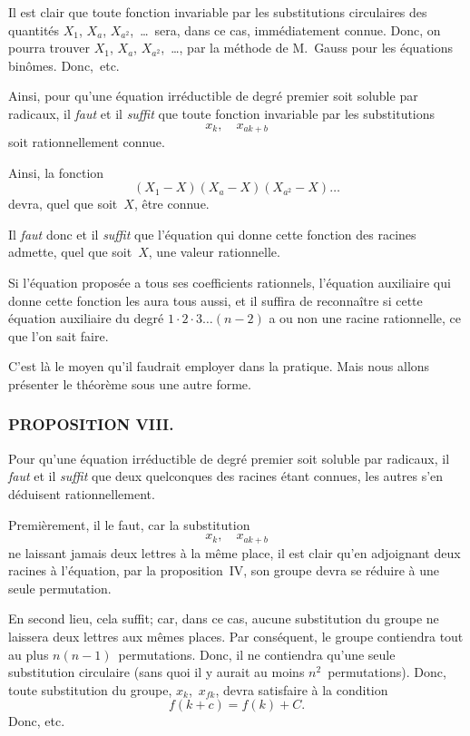 \documentclass[leqno,12pt]{book}[2005/09/16]
\newcommand{\Subsection}[1]{\subsubsection*{\centering\small\normalfont #1}}
\newenvironment{MyEnvt}[2]{%
  \medskip\par
  \ifthenelse{\equal{#1}{}}{%
    \textsc{#2.}\ --- %
  }{%
    \textsc{#2 #1}\ --- %
  }%
  \itshape\ignorespaces
}{\medskip\normalfont}
\newenvironment{Theoreme}[1][]{\begin{MyEnvt}{#1}{Theorème}}{\end{MyEnvt}}
\begin{document}
Il est clair que toute fonction invariable par les substitutions
circulaires des quantités $X_{1}$, $X_{a}$, $X_{a^{2}}$,~\dots\ sera, dans ce cas, immédiatement
connue. Donc, on pourra trouver $X_{1}$, $X_{a}$, $X_{a^{2}}$,~\dots, par
la méthode de M.~Gauss pour les équations binômes. Donc,~etc.

Ainsi, pour qu'une équation irréductible de degré premier soit
soluble par radicaux, il \emph{faut} et il \emph{suffit} que toute fonction invariable
par les substitutions
\[
x_{k}, \quad  x_{ak+b}
\]
soit rationnellement connue.

Ainsi, la fonction
\[
(X_{1} - X) (X_{a} - X) (X_{a^{2}} - X) \dots
\]
devra, quel que soit~$X$, être connue.

Il \emph{faut} donc et il \emph{suffit} que l'équation qui donne cette fonction
des racines admette, quel que soit~$X$, une valeur rationnelle.

Si l'équation proposée a tous ses coefficients rationnels, l'équation
auxiliaire qui donne cette fonction les aura tous aussi, et il
suffira de reconnaître si cette équation auxiliaire du degré
$1 · 2 · 3 \dots (n - 2)$ a ou non une racine rationnelle, ce que l'on
sait faire.

C'est là le moyen qu'il faudrait employer dans la pratique. Mais
nous allons présenter le théorème sous une autre forme.


\Subsection{PROPOSITION VIII.}

\begin{Theoreme}
Pour qu'une équation irréductible de degré
premier soit soluble par radicaux, il \emph{faut} et il \emph{suffit} que deux
quelconques des racines étant connues, les autres s'en déduisent
rationnellement.
\end{Theoreme}

Premièrement, il le faut, car la substitution
\[
x_{k}, \quad x_{ak+b}
\]
ne laissant jamais deux lettres à la même place, il est clair qu'en
adjoignant deux racines à l'équation, par la proposition~IV, son
groupe devra se réduire à une seule permutation.

En second lieu, cela suffit; car, dans ce cas, aucune substitution
du groupe ne laissera deux lettres aux mêmes places. Par conséquent,
le groupe contiendra tout au plus $n(n - 1)$~permutations.
Donc, il ne contiendra qu'une seule substitution circulaire (sans
quoi il y aurait au moins $n^{2}$~permutations). Donc, toute substitution
du groupe, $x_{k}$,~$x_{fk}$, devra satisfaire à la condition
\[
f(k + c) = f(k) + C.
\]
Donc, etc.
\end{document}
